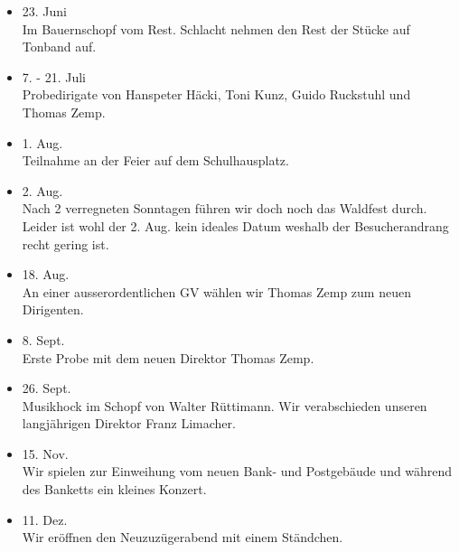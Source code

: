 \begin{history}
\begin{itemize}
        \item[]23. Juni\\
        Im Bauernschopf vom Rest. Schlacht nehmen den Rest der Stücke auf
        Tonband auf.

        \item[]7. - 21. Juli\\
        Probedirigate von Hanspeter Häcki, Toni Kunz, Guido Ruckstuhl und Thomas
        Zemp.

        \item[]1. Aug.\\
        Teilnahme an der Feier auf dem Schulhausplatz.

        \item[]2. Aug.\\
        Nach 2 verregneten Sonntagen führen wir doch noch das Waldfest durch.
        Leider ist wohl der 2. Aug. kein ideales Datum weshalb der
        Besucherandrang recht gering ist.

        \item[]18. Aug.\\
        An einer ausserordentlichen GV wählen wir Thomas Zemp zum neuen
        Dirigenten.

        \item[]8. Sept.\\
        Erste Probe mit dem neuen Direktor Thomas Zemp.

        \item[]26. Sept.\\
        Musikhock im Schopf von Walter Rüttimann. Wir verabschieden unseren
        langjährigen Direktor Franz Limacher.

        \item[]15. Nov.\\
        Wir spielen zur Einweihung vom neuen Bank- und Postgebäude und während
        des Banketts ein kleines Konzert.

        \item[]11. Dez.\\
        Wir eröffnen den Neuzuzügerabend mit einem Ständchen.


    \end{itemize}

\end{history}
